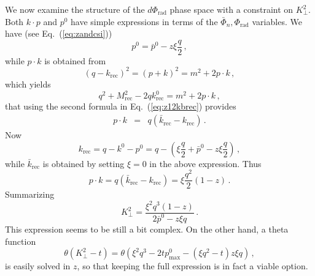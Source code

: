 \documentclass[11pt,a4paper]{article}
\newcommand{\tmop}[1]{\ensuremath{\operatorname{#1}}}
\begin{document}
We now examine the structure of the $d \Phi_{\tmop{rad}}$ phase space with a
constraint on $K_{\perp}^2$. Both $k \cdot p$ and $p^0$ have simple
expressions in terms of the $\bar{\Phi}_n, \Phi_{\tmop{rad}}$ variables. We
have (see Eq.~(\ref{eq:zandcsi}))
\begin{equation}
  p^0 = \bar{p}^0 - z \xi \frac{q}{2} \, ,
\end{equation}
while $p \cdot k$ is obtained from
\begin{equation}
  (q - k_{\tmop{rec}})^2 = (p + k)^2 = m^2 + 2 p \cdot k \, ,
\end{equation}
which yields
\begin{equation}
  q^2 + M_{\tmop{rec}}^2 - 2 qk_{\tmop{rec}}^0 = m^2 + 2 p \cdot k \, ,
\end{equation}
that using the second formula in Eq.~(\ref{eq:z12kbrec}) provides
\begin{eqnarray}
  p \cdot k & = & q ( \bar{k}_{\tmop{rec}} - k_{\tmop{rec}}) \, . 
\end{eqnarray}
Now
\begin{equation}
  k_{\tmop{rec}} = q - k^0 - p^0 = q - \left( \xi \frac{q}{2} + \bar{p}^0 - z
  \xi \frac{q}{2} \right) \, ,
\end{equation}
while $\bar{k}_{\tmop{rec}}$ is obtained by setting $\xi = 0$ in the above
expression. Thus
\begin{equation}
  p \cdot k = q ( \bar{k}_{\tmop{rec}} - k_{\tmop{rec}}) = \xi \frac{q^2}{2}
  (1 - z) \, . \label{eq:pdotk}
\end{equation}
Summarizing
\begin{equation}
  K_{\perp}^2 = \frac{\xi^2 q^3 \left( 1 - z \right)}{2 \bar{p}^0 - z \xi q} \, .
\end{equation}
This expression seems to be still a bit complex. On the other hand, a theta
function
\begin{equation}
  \theta (K_{\perp}^2 - t) = \theta \left( \xi^2 q^3 - 2 tp_{\max}^0 - (\xi
  q^2 - t) z \xi q \right) \, ,
\end{equation}
is easily solved in $z$, so that keeping the full expression is in fact a
viable option.
\end{document}
